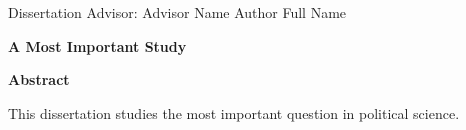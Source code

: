 \noindent Dissertation Advisor: Advisor Name \hfill Author Full Name

\doublespacing

\begin{center}
\vspace{0.5 in} \LARGE{\bf A Most Important Study}

\vspace{0.25in}
\large{\textbf{Abstract}}
\end{center}

This dissertation studies the most important question in political science. \lipsum[1-2]

